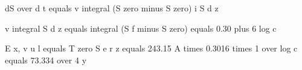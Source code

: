dS over d t equals v integral (S zero minus S zero) i S d z

v integral S d z equals integral (S f minus S zero) equals 0.30 plus 6 log c

E x, v u l equals T zero S e r z equals 243.15 A times 0.3016 times 1 over log c equals 73.334 over 4 y